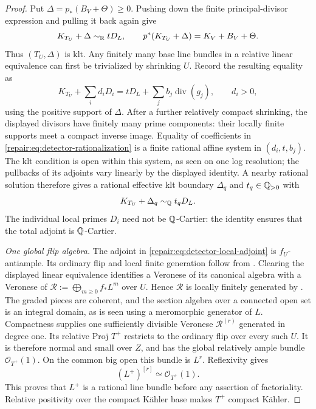 \begin{proof}
Put $\Delta=p_*(B_V+\Theta)\geq0$. Pushing down the finite
principal-divisor expression and pulling it back again give
\[
 K_{T_U}+\Delta\sim_{\mathbb R}tD_L,
 \qquad p^*(K_{T_U}+\Delta)=K_V+B_V+\Theta.
\]
Thus $(T_U,\Delta)$ is klt. Any finitely many base line bundles in a
relative linear equivalence can first be trivialized by shrinking $U$.
Record the resulting equality as
\begin{equation}\label{repair:eq:detector-rationalization}
 K_{T_U}+\sum_i d_iD_i=tD_L+\sum_j b_j\operatorname{div}(g_j),
 \qquad d_i>0,
\end{equation}
using the positive support of $\Delta$. After a further relatively
compact shrinking, the displayed divisors have finitely many prime
components: their locally finite supports meet a compact inverse image.
Equality of coefficients in \eqref{repair:eq:detector-rationalization} is a
finite rational affine system in $(d_i,t,b_j)$. The klt condition is
open within this system, as seen on one log resolution; the pullbacks
of its adjoints vary linearly by the displayed identity. A nearby
rational solution therefore gives a rational effective klt boundary
$\Delta_q$ and $t_q\in\mathbb Q_{>0}$ with
\begin{equation}\label{repair:eq:detector-local-adjoint}
 K_{T_U}+\Delta_q\sim_{\mathbb Q}t_qD_L.
\end{equation}
The individual local primes $D_i$ need not be $\mathbb Q$-Cartier: the identity
ensures that the total adjoint is $\mathbb Q$-Cartier.

\smallskip\noindent
\emph{One global flip algebra.}
The adjoint in \eqref{repair:eq:detector-local-adjoint} is $f_U$-antiample.
Its ordinary flip and local finite generation follow from
\cite[Theorems~1.14 and~1.18]{Fujino2022}. Clearing the displayed
linear equivalence identifies a Veronese of its canonical algebra
with a Veronese of $\mathcal R:=\bigoplus_{m\geq0}f_*L^m$ over $U$.
Hence $\mathcal R$ is locally finitely generated by
\cite[Lemma~2.26]{Fujino2022}. The graded pieces are coherent, and
the section algebra over a connected open set is an integral domain,
as is seen using a meromorphic generator of $L$.
Compactness supplies one sufficiently divisible Veronese
$\mathcal R^{(r)}$ generated in degree one. Its relative Proj $T^+$
restricts to the ordinary flip over every such $U$. It is therefore
normal and small over $Z$, and has the global relatively ample bundle
$\mathcal O_{T^+}(1)$. On the common big open this bundle is $L^r$.
Reflexivity gives
\[
 (L^+)^{[r]}\simeq\mathcal O_{T^+}(1).
\]
This proves that $L^+$ is a rational line bundle before any assertion
of factoriality. Relative positivity over the compact K\"ahler base
makes $T^+$ compact K\"ahler.


\end{proof}
